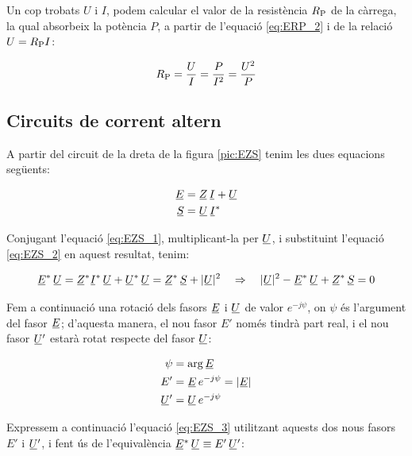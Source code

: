 Un cop trobats $U$ i $I$, podem calcular el valor de la resistència
$R_\mathrm{P}$ de la càrrega, la qual absorbeix la potència $P$, a
partir de l'equació \eqref{eq:ERP_2} i de la relació $U =R_\mathrm{P}
I$:

\begin{equation}
   R_\mathrm{P} = \frac{U}{I} = \frac{P}{I^2} = \frac{U^2}{P}
\end{equation}

\subsection{Circuits de corrent altern}

A partir del circuit de la dreta de la figura \vref{pic:EZS} tenim les dues equacions següents:

\begin{align}
   \cmplx{E} &= \cmplx{Z} \, \cmplx{I} + \cmplx{U} \label{eq:EZS_1} \\
   \cmplx{S} &= \cmplx{U} \, \cmplx{I}^*           \label{eq:EZS_2}
\end{align}

Conjugant l'equació \eqref{eq:EZS_1}, multiplicant-la per $\cmplx{U}$, i substituint l'equació \eqref{eq:EZS_2} en aquest resultat, tenim:

\begin{equation}
   \cmplx{E}^* \, \cmplx{U} = \cmplx{Z}^* \cmplx{I}^* \, \cmplx{U} + \cmplx{U}^* \, \cmplx{U} =
   \cmplx{Z}^* \, \cmplx{S} + |\cmplx{U}|^2 \quad \Rightarrow \quad
   |\cmplx{U}|^2 - \cmplx{E}^* \, \cmplx{U} + \cmplx{Z}^* \, \cmplx{S} = 0
   \label{eq:EZS_3}
\end{equation}

Fem a continuació una rotació dels fasors $\cmplx{E}$ i
$\cmplx{U}$ de valor $e^{-j\psi}$, on $\psi$ és l'argument
del fasor $\cmplx{E}$; d'aquesta manera, el nou fasor $E'$ només tindrà part real, i el nou fasor $\cmplx{U}'$ estarà rotat 
respecte del fasor $\cmplx{U}$:

\begin{align}
   \psi &= \arg\cmplx{E} \label{eq:EZS_9} \\
   E' &= \cmplx{E} \, e^{-j\psi} = |\cmplx{E}|  \label{eq:EZS_4} \\
   \cmplx{U}' &= \cmplx{U} \, e^{-j\psi}   \label{eq:EZS_5} 
\end{align}

Expressem a continuació l'equació \eqref{eq:EZS_3} utilitzant
aquests dos nous fasors $E'$ i $\cmplx{U}'$, i fent ús de l'equivalència $\cmplx{E}^* \, \cmplx{U} \equiv E'\, \cmplx{U}'$:

